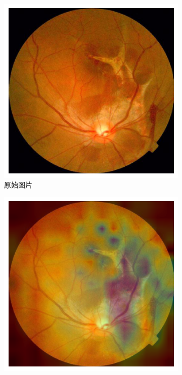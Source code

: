 \documentclass[twocolumn, fontsize=10pt]{article}
\begin{document}
\begin{appendices}
\begin{figure}[H]
\begin{subfigure}[b]{0.2\textwidth}
    \end{subfigure} \\
    \vspace{5mm}
    \begin{subfigure}[b]{0.2\textwidth}
        \raggedleft
        \includegraphics[width=\textwidth]{image-3.png}
        \caption{原始图片}
    \end{subfigure}
    \hspace{5mm}
    \begin{subfigure}[b]{0.2\textwidth}
        \centering
        \includegraphics[width=\textwidth]{cbam-heatmap-3.png}

\end{subfigure}
\end{figure}
\end{appendices}
\end{document}
